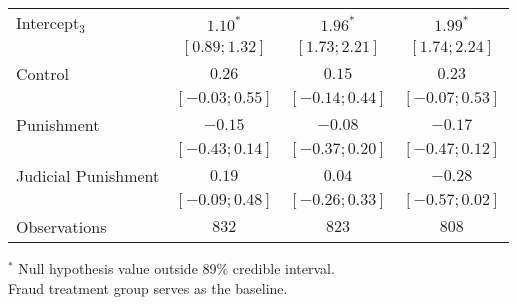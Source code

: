 \begin{table}[h]
\begin{center}
\begin{threeparttable}
\begin{tabular}{l c c c}
Intercept$_3$       & $1.10^{*}$        & $1.96^{*}$        & $1.99^{*}$        \\
                    & $ [ 0.89;  1.32]$ & $ [ 1.73;  2.21]$ & $ [ 1.74;  2.24]$ \\
Control             & $0.26$            & $0.15$            & $0.23$            \\
                    & $ [-0.03;  0.55]$ & $ [-0.14;  0.44]$ & $ [-0.07;  0.53]$ \\
Punishment          & $-0.15$           & $-0.08$           & $-0.17$           \\
                    & $ [-0.43;  0.14]$ & $ [-0.37;  0.20]$ & $ [-0.47;  0.12]$ \\
Judicial Punishment & $0.19$            & $0.04$            & $-0.28$           \\
                    & $ [-0.09;  0.48]$ & $ [-0.26;  0.33]$ & $ [-0.57;  0.02]$ \\
\hline
Observations        & $832$             & $823$             & $808$             \\
\hline
\end{tabular}
\begin{tablenotes}[flushleft]
\scriptsize{$^*$ Null hypothesis value outside 89\% credible interval.  \\
Fraud treatment group serves as the baseline.}
\end{tablenotes}
\end{threeparttable}
\label{table:coefficients}
\end{center}
\end{table}
